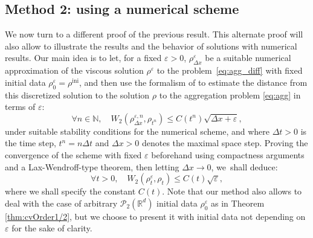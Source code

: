 \documentclass[11pt]{article}
\numberwithin{equation}{section}
\newcommand{\ini}{\mathrm{ini}}
\def\NN{\mathbb{N}}
\def\RR{\mathbb{R}}
\def\eps{\varepsilon}
\def\dt{\Delta t}
\def\dx{\Delta x}
\def\calP{{\mathcal P}}
\theoremstyle{plain}
\theoremstyle{definition}
\begin{document}
\subsection{Method 2: using a numerical scheme}\label{section:lambdaConvex:2}

We now turn to a different proof of the previous result. This alternate proof will also allow to illustrate the results and the behavior of solutions with numerical results. Our main idea is to let, for a fixed $\eps>0$, $\rho_{\dx}^\eps$ be a suitable numerical approximation of the viscous solution $\rho^\eps$ to the problem~\eqref{eq:agg_diff} with fixed initial data $\rho_0^\eps = \rho^{\ini}$, and then use the formalism of \cite{dlv20} to estimate the distance from this discretized solution to the solution $\rho$ to the aggregation problem \eqref{eq:agg} in terms of $\eps$:
\[
\forall n \in \NN, \quad W_2(\rho_{\dx}^{\eps,n}, \rho_{t^n}) \leq C(t^n) \sqrt{\dx + \eps},
\]
under suitable stability conditions for the numerical scheme, and where $\dt>0$ is the time step, $t^n = n\dt$ and $\dx>0$ denotes the maximal space step. Proving the convergence of the scheme with fixed $\eps$ beforehand using compactness arguments and a Lax-Wendroff-type theorem, then letting $\dx \to 0$, we~shall deduce:
\[
\forall t>0, \quad W_2(\rho_t^\eps, \rho_t) \leq C(t) \sqrt{\eps},
\]
where we shall specify the constant $C(t)$. Note that our method also allows to deal with the case of arbitrary $\calP_2(\RR^d)$ initial data $\rho_0^\eps$ as in Theorem \ref{thm:cvOrder1/2}, but we choose to present it with initial data not depending on $\eps$ for the sake of clarity.
\end{document}
